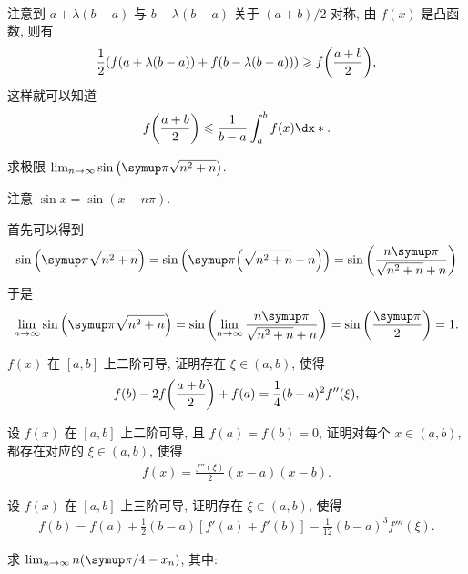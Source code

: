 \begin{exercise}[series=exer]
\begin{answer}
\begin{align*}
      \end{align*}
      注意到 $ a + \lambda(b - a) $ 与 $ b - \lambda(b - a) $ 关于 $ (a + b)/2 $ 对称, 由 $ f(x) $ 是凸函数, 则有
      \begin{align*}
          \frac{1}{2}(f(a + \lambda(b - a)) + f(b - \lambda(b - a))) \geqslant f\qty(\frac{a + b}{2}),
      \end{align*}
      这样就可以知道
      \begin{align*}
          f\qty(\frac{a + b}{2}) \le \frac{1}{b - a} \int_{a}^{b} f(x) \dx*.
      \end{align*}
  \end{answer}
  \item 求极限 $ \limit{n}{\infty} \sin\qty(\pi \sqrt{n^{2} + n}) $.
  \begin{hint}
      注意 $ \sin x = \sin (x - n \pi) $.
  \end{hint}
  \begin{answer}
      首先可以得到
      \begin{align*}
          \sin\qty(\pi \sqrt{n^{2} + n}) = \sin\qty(\pi \qty(\sqrt{n^{2} + n} - n)) = \sin\qty(\frac{n\pi}{\sqrt{n^{2} + n} + n})
      \end{align*}
      于是
      \begin{align*}
          \limit{n}{\infty}\sin\qty(\pi \sqrt{n^{2} + n}) = \sin\qty(\limit{n}{\infty}\frac{n\pi}{\sqrt{n^{2} + n} + n}) = \sin\qty(\frac{\pi}{2}) = 1.
      \end{align*}
  \end{answer}
  \item $ f(x) $ 在 $ [a, b] $ 上二阶可导, 证明存在 $ \xi \in (a, b) $, 使得
  \begin{align*}
      f(b) - 2f\qty(\frac{a + b}{2}) + f(a) = \frac{1}{4} (b - a)^{2} f''(\xi),
  \end{align*}
  \item 设 $ f(x) $ 在 $ [a, b] $ 上二阶可导, 且 $ f(a) = f(b)  = 0 $, 证明对每个 $ x \in (a, b) $, 都存在对应的 $ \xi \in (a, b) $, 使得
  \begin{align*}
      f(x) = \frac{f''(\xi)}{2} (x - a) (x - b).
  \end{align*}
  \item 设 $ f(x) $ 在 $ [a, b] $ 上三阶可导, 证明存在 $ \xi \in (a, b) $, 使得
  \begin{align*}
      f(b) = f(a) + \frac{1}{2} (b - a) [f'(a) + f'(b)] - \frac{1}{12} (b - a)^{3} f'''(\xi).
  \end{align*}
  \item 求 $ \limit{n}{\infty} n \qty(\pi/4 - x_{n}) $, 其中:

\end{exercise}

